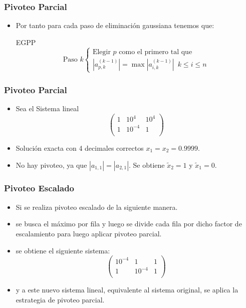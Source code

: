 \documentclass{beamer}
\begin{document}
\begin{frame}
\frametitle{Pivoteo Parcial}
\begin{itemize}
  \item<1-> Por tanto para cada paso de eliminaci\'on gaussiana tenemos que:
  \begin{block}{EGPP}
      $$
        \mbox{Paso }k\left\{\begin{array}{l}
            \mbox{Elegir }p\mbox{ como el primero tal que}\\
            |a_{p,k}^{(k-1)}|=\max|a_{i,k}^{(k-1)}|\,\,\,k\leq i\leq n
            \end{array}\right.
      $$  
  \end{block}  
\end{itemize}
\end{frame}
\begin{frame} 
\frametitle{Pivoteo Parcial}
\begin{itemize}
  \item<1-> Sea el Sistema lineal 
  $$
  \left(\begin{array}{cc|c}
         1 & 10^4 & 10^4 \\
         1 & 10^{-4} & 1 \\
        \end{array}
  \right)
  $$
  \item<2-> Soluci\'on exacta con 4 decimales correctos $x_1 = x_2 = 0.9999$.  
  \item<3-> No hay pivoteo, ya que $|a_{1,1}|=|a_{2,1}|$. Se obtiene $\tilde x_2=1$ y $\tilde x_1=0$.
\end{itemize}
\end{frame}
\begin{frame}
\frametitle{Pivoteo Escalado}
\begin{itemize}
  \item<1-> Si se realiza pivoteo escalado de la siguiente manera.
  \item <2-> se busca el m\'aximo por fila y luego se divide cada fila por dicho factor de escalamiento para luego aplicar pivoteo parcial.
  \item<4->se obtiene el siguiente sistema:
  $$
  \left(\begin{array}{cc|c}
         10^{-4} & 1 & 1 \\
         1 & 10^{-4} & 1 \\
        \end{array}
  \right)$$
  \item<5->y a este nuevo sistema lineal, equivalente al sistema original, se aplica la estrategia de pivoteo parcial.
\end{itemize}
\end{frame}
\end{document}
